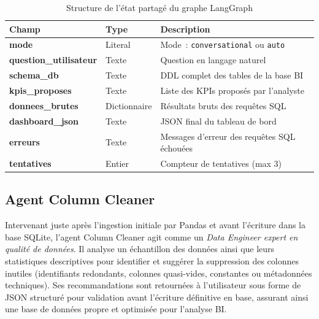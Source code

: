 \begin{table}[H]
\centering
\renewcommand{\arraystretch}{1.5} %
\caption{Structure de l'état partagé du graphe LangGraph}
\label{tab:graphstate}
\begin{tabularx}{\textwidth}{
    >{\raggedright\arraybackslash\bfseries}l 
    >{\centering\arraybackslash}p{2.8cm} 
    >{\raggedright\arraybackslash}X
}
\toprule
\textbf{Champ} & \textbf{Type} & \textbf{Description} \\
\midrule
mode                 & Literal      & Mode~: \texttt{conversational} ou \texttt{auto} \\
question\_utilisateur & Texte        & Question en langage naturel \\
schema\_db            & Texte        & DDL complet des tables de la base BI \\
kpis\_proposes       & Texte        & Liste des KPIs proposés par l'analyste \\
donnees\_brutes      & Dictionnaire & Résultats bruts des requêtes SQL \\
dashboard\_json      & Texte        & JSON final du tableau de bord \\
erreurs              & Texte        & Messages d'erreur des requêtes SQL échouées \\
tentatives           & Entier       & Compteur de tentatives (max 3) \\
\bottomrule
\end{tabularx}
\end{table}

\subsection{Agent Column Cleaner}
Intervenant juste après l'ingestion initiale par Pandas et avant l'écriture dans la base SQLite, l'agent Column Cleaner agit comme un \textit{Data Engineer expert en qualité de données}. Il analyse un échantillon des données ainsi que leurs statistiques descriptives pour identifier et suggérer la suppression des colonnes inutiles (identifiants redondants, colonnes quasi-vides, constantes ou métadonnées techniques). Ses recommandations sont retournées à l'utilisateur sous forme de JSON structuré pour validation avant l'écriture définitive en base, assurant ainsi une base de données propre et optimisée pour l'analyse BI.

